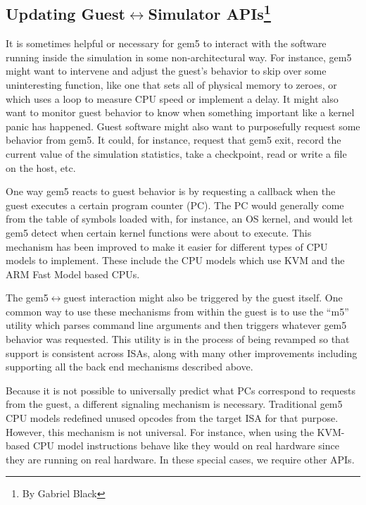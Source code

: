 \subsection[Updating Guest<->Simulator APIs]{Updating Guest$\leftrightarrow$Simulator APIs\footnote{By Gabriel Black}}


It is sometimes helpful or necessary for gem5 to interact with the software running inside the simulation in some non-architectural way.
For instance, gem5 might want to intervene and adjust the guest's behavior to skip over some uninteresting function, like one that sets all of physical memory to zeroes, or which uses a loop to measure CPU speed or implement a delay.
It might also want to monitor guest behavior to know when something important like a kernel panic has happened.
Guest software might also want to purposefully request some behavior from gem5.
It could, for instance, request that gem5 exit, record the current value of the simulation statistics, take a checkpoint, read or write a file on the host, etc.

One way gem5 reacts to guest behavior is by requesting a callback when the guest executes a certain program counter (PC).
The PC would generally come from the table of symbols loaded with, for instance, an OS kernel, and would let gem5 detect when certain kernel functions were about to execute.
This mechanism has been improved to make it easier for different types of CPU models to implement.
These include the CPU models which use KVM and the ARM Fast Model based CPUs.

The gem5$\leftrightarrow$guest interaction might also be triggered by the guest itself.
One common way to use these mechanisms from within the guest is to use the ``m5'' utility which parses command line arguments and then triggers whatever gem5 behavior was requested.
This utility is in the process of being revamped so that support is consistent across ISAs, along with many other improvements including supporting all the back end mechanisms described above.

Because it is not possible to universally predict what PCs correspond to requests from the guest, a different signaling mechanism is necessary.
Traditional gem5 CPU models redefined unused opcodes from the target ISA for that purpose.
However, this mechanism is not universal.
For instance, when using the KVM-based CPU model instructions behave like they would on real hardware since they are running on real hardware.
In these special cases, we require other APIs.

